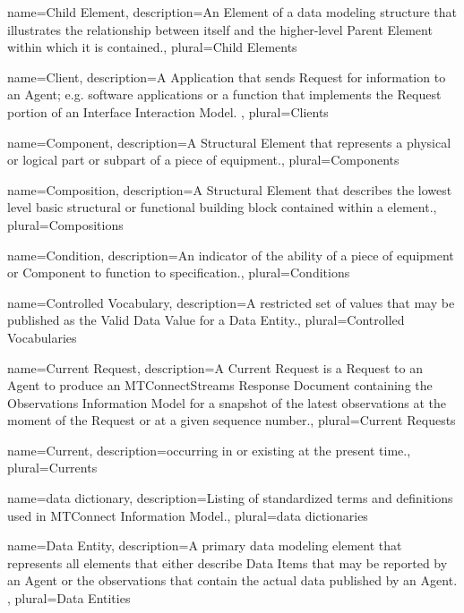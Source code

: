 {
    name={Child Element},
	description={An \gls{Element} of a data modeling structure that illustrates the relationship between itself and the higher-level \gls{Parent Element} within which it is contained.},
	plural={Child Elements}
}

{
    name={Client},
	description={A \gls{Application} that sends \gls{Request} for information to an \gls{Agent}; e.g. software applications or a function that implements the \gls{Request} portion of an \gls{Interface} \gls{Interaction Model}.
},
	plural={Clients}
}

{
    name={Component},
	description={A \gls{Structural Element} that represents a physical or logical part or subpart of a piece of equipment.},
	plural={Components}
}

{
    name={Composition},
	description={A \gls{Structural Element} that describes the lowest level basic structural or functional building block contained within a  element.},
	plural={Compositions}
}

{
    name={Condition},
	description={An indicator of the ability of a piece of equipment or \gls{Component} to function to specification.},
	plural={Conditions}
}

{
    name={Controlled Vocabulary},
	description={A restricted set of values that may be published as the \gls{Valid Data Value} for a \gls{Data Entity}.},
	plural={Controlled Vocabularies}
}

{
    name={Current Request},
	description={A \gls{Current Request} is a \gls{Request} to an \gls{Agent} to produce an \gls{MTConnectStreams Response Document} containing the \gls{Observations Information Model} for a snapshot of the latest \glspl{observation} at the moment of the \gls{Request} or at a given \gls{sequence number}.},
	plural={Current Requests}
}

{
    name={Current},
	description={occurring in or existing at the present time.},
	plural={Currents}
}

{
    name={data dictionary},
	description={Listing of standardized terms and definitions used in \gls{MTConnect Information Model}.},
	plural={data dictionaries}
}

{
    name={Data Entity},
	description={A primary data modeling element that represents all elements that either describe \glspl{Data Item} that may be reported by an \gls{Agent} or the \glspl{observation} that contain the actual data published by an \gls{Agent}.
},
	plural={Data Entities}
}

